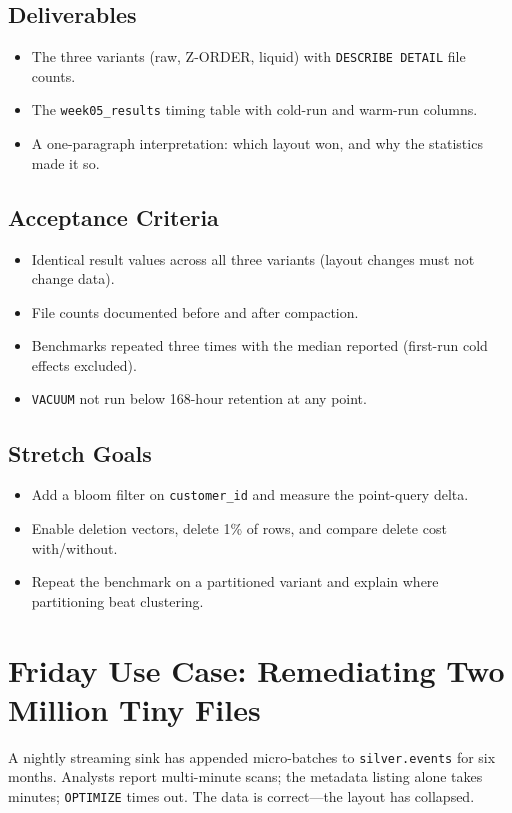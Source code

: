 \subsection*{Deliverables}
\begin{itemize}
    \item The three variants (raw, Z-ORDER, liquid) with \texttt{DESCRIBE DETAIL} file counts.
    \item The \texttt{week05\_results} timing table with cold-run and warm-run columns.
    \item A one-paragraph interpretation: which layout won, and why the statistics made it so.
\end{itemize}

\subsection*{Acceptance Criteria}
\begin{itemize}
    \item Identical result values across all three variants (layout changes must not change data).
    \item File counts documented before and after compaction.
    \item Benchmarks repeated three times with the median reported (first-run cold effects excluded).
    \item \texttt{VACUUM} not run below 168-hour retention at any point.
\end{itemize}

\subsection*{Stretch Goals}
\begin{itemize}
    \item Add a bloom filter on \texttt{customer\_id} and measure the point-query delta.
    \item Enable deletion vectors, delete 1\% of rows, and compare delete cost with/without.
    \item Repeat the benchmark on a partitioned variant and explain where partitioning beat clustering.
\end{itemize}

\section{Friday Use Case: Remediating Two Million Tiny Files}
A nightly streaming sink has appended micro-batches to \texttt{silver.events} for six months. Analysts report multi-minute scans; the metadata listing alone takes minutes; \texttt{OPTIMIZE} times out. The data is correct---the layout has collapsed.

